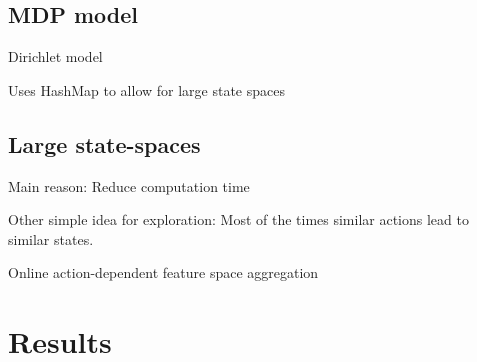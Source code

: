 \documentclass[11pt]{article}
\numberwithin{equation}{section}
\begin{document}
\begin{flushleft}
\newpage 

\text{ } \newline

\text{ } \newline

\text{ } \newline

\subsection{MDP model}

\text{ } \newline

Dirichlet model \newline

Uses HashMap to allow for large state spaces

\text{ } \newline

\newpage

\text{ } \newline

\text{ } \newline

\text{ } \newline 

\subsection{Large state-spaces}

\text{ } \newline

Main reason: Reduce computation time

\text{ } \newline

Other simple idea for exploration: Most of the times similar actions lead to similar states.

\text{ } \newline

Online action-dependent feature space aggregation


\text{ } \newline

\newpage 

\text{ } \newline

\text{ } \newline

\text{ } \newline

\section{Results}


\end{flushleft}
\end{document}
